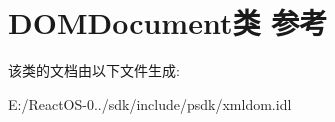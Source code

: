 \hypertarget{class_d_o_m_document}{}\section{D\+O\+M\+Document类 参考}
\label{class_d_o_m_document}


该类的文档由以下文件生成\+:\begin{DoxyCompactItemize}
\item 
E\+:/\+React\+O\+S-\/0../sdk/include/psdk/xmldom.\+idl\end{DoxyCompactItemize}

